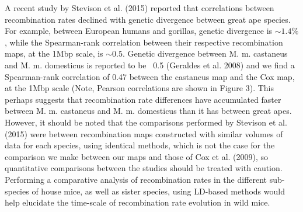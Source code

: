 A recent study by Stevison et al. (2015) reported that correlations between recombination rates declined with genetic divergence between great ape species. For example, between European humans and gorillas, genetic divergence is $\sim1.4\%$, while the Spearman-rank correlation between their respective recombination maps, at the 1Mbp scale, is $\sim0.5$. Genetic divergence between M. m. castaneus and M. m. domesticus is reported to be ~0.5 (Geraldes et al. 2008) and we find a Spearman-rank correlation of 0.47 between the castaneus map and the Cox map, at the 1Mbp scale (Note, Pearson correlations are shown in Figure 3). This perhaps suggests that recombination rate differences have accumulated faster between M. m. castaneus and M. m. domesticus than it has between great apes. However, it should be noted that the comparisons performed by Stevison et al. (2015) were between recombination maps constructed with similar volumes of data for each species, using identical methods, which is not the case for the comparison we make between our maps and those of Cox et al. (2009), so quantitative comparisons between the studies should be treated with caution. Performing a comparative analysis of recombination rates in the different sub-species of house mice, as well as sister species, using LD-based methods would help elucidate the time-scale of recombination rate evolution in wild mice.

